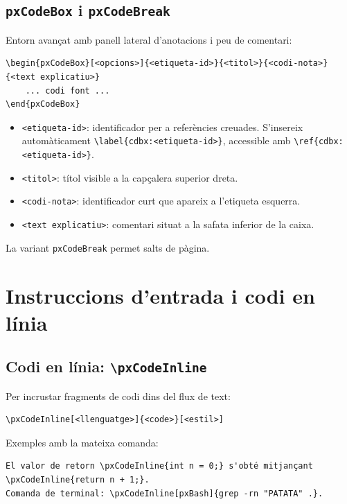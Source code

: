 \documentclass[11pt,a4paper]{article}
\begin{document}
\subsection{\texttt{pxCodeBox} i \texttt{pxCodeBreak}}

Entorn avan\c{c}at amb panell lateral d'anotacions i peu de comentari:

\begin{verbatim}
\begin{pxCodeBox}[<opcions>]{<etiqueta-id>}{<titol>}{<codi-nota>}{<text explicatiu>}
    ... codi font ...
\end{pxCodeBox}
\end{verbatim}

\begin{itemize}
  \item \texttt{<etiqueta-id>}: identificador per a refer\`encies creuades. S'insereix autom\`aticament \texttt{\textbackslash label\{cdbx:<etiqueta-id>\}}, accessible amb \texttt{\textbackslash ref\{cdbx:<etiqueta-id>\}}.
  \item \texttt{<titol>}: t\'itol visible a la cap\c{c}alera superior dreta.
  \item \texttt{<codi-nota>}: identificador curt que apareix a l'etiqueta esquerra.
  \item \texttt{<text explicatiu>}: comentari situat a la safata inferior de la caixa.
\end{itemize}

La variant \texttt{pxCodeBreak} permet salts de p\`agina.

\section{Instruccions d'entrada i codi en l\'inia}

\subsection{Codi en l\'inia: \texttt{\textbackslash pxCodeInline}}

Per incrustar fragments de codi dins del flux de text:

\begin{verbatim}
\pxCodeInline[<llenguatge>]{<code>}[<estil>]
\end{verbatim}

Exemples amb la mateixa comanda:

\begin{verbatim}
El valor de retorn \pxCodeInline{int n = 0;} s'obté mitjançant \pxCodeInline{return n + 1;}.
Comanda de terminal: \pxCodeInline[pxBash]{grep -rn "PATATA" .}.
\end{verbatim}
\end{document}
